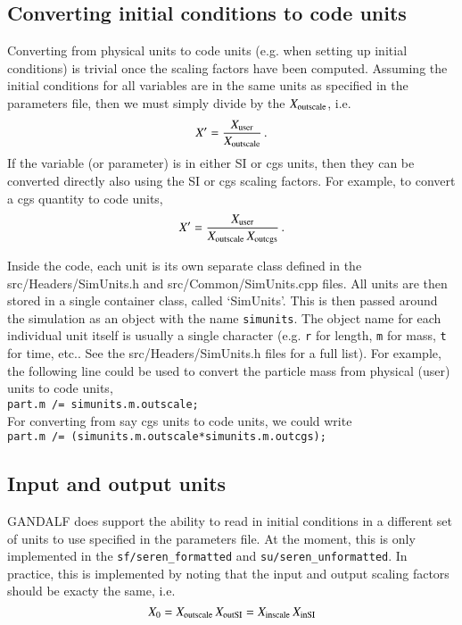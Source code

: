 \documentclass[a4paper]{article}
\newcommand{\var}[1]{\texttt{#1}}
\begin{document}
\subsection{Converting initial conditions to code units}
Converting from physical units to code units (e.g. when setting up initial conditions) is trivial once the scaling factors have been computed.  Assuming the initial conditions for all variables are in the same units as specified in the parameters file, then we must simply divide by the $X_{\rm outscale}$, i.e.
\begin{equation}
X' = \frac{X_{\rm user}}{X_{\rm outscale}}\,.
\end{equation}
If the variable (or parameter) is in either SI or cgs units, then they can be converted directly also using the SI or cgs scaling factors.  For example, to convert a cgs quantity to code units,
\begin{equation}
X' = \frac{X_{\rm user}}{X_{\rm outscale}\,X_{\rm outcgs}}\,.
\end{equation}

Inside the code, each unit is its own separate class defined in the src/Headers/SimUnits.h and src/Common/SimUnits.cpp files.  All units are then stored in a single container class, called `SimUnits'.  This is then passed around the simulation as an object with the name \var{simunits}.  The object name for each individual unit itself is usually a single character (e.g. \var{r} for length, \var{m} for mass, \var{t} for time, etc..  See the src/Headers/SimUnits.h files for a full list).  For example, the following line could be used to convert the particle mass from physical (user) units to code units,  \\
\newline
\noindent \var{part.m /= simunits.m.outscale;} \\

\noindent For converting from say cgs units to code units, we could write \\
\newline
\noindent \var{part.m /= (simunits.m.outscale*simunits.m.outcgs);} \\





\subsection{Input and output units}
GANDALF does support the ability to read in initial conditions in a different set of units to use specified in the parameters file.  At the moment, this is only implemented in the \var{sf/seren\_formatted} and \var{su/seren\_unformatted}.  In practice, this is implemented by noting that the input and output scaling factors should be exacty the same, i.e.
\begin{equation}
X_0 = X_{\rm outscale} \, X_{\rm outSI} = X_{\rm inscale} \, X_{\rm inSI}
\end{equation}
\end{document}
